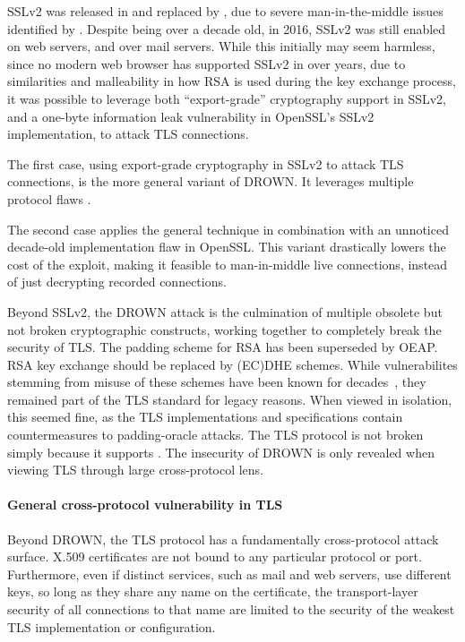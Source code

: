 SSLv2 was released in \TK and replaced by \TK, due to severe man-in-the-middle
issues identified by \TK. Despite being over a decade old, in 2016, SSLv2 was
still enabled on \TK web servers, and over \TK mail servers. While this 
initially may seem harmless, since no modern web browser has supported SSLv2
in over \TK years, due to similarities and malleability in how RSA is used
during the key exchange process, it was possible to leverage both
``export-grade'' cryptography support in SSLv2, and a one-byte information leak
vulnerability in OpenSSL's SSLv2 implementation, to attack TLS connections.

The first case, using export-grade cryptography in SSLv2 to attack TLS
connections, is the more general variant of DROWN. It leverages multiple
protocol flaws \TK.

The second case applies the general technique in combination
with an unnoticed decade-old implementation flaw in OpenSSL. This variant
drastically lowers the cost of the exploit, making it feasible to man-in-middle
live connections, instead of just decrypting recorded connections.

Beyond SSLv2, the DROWN attack is the culmination of multiple obsolete but not
broken cryptographic constructs, working together to completely break the
security of TLS\@. The \PKCS padding scheme for RSA has been superseded by
OEAP. RSA key exchange should be replaced by (EC)DHE schemes. While
vulnerabilites stemming from misuse of these schemes have been known for
decades~\cite{bleichenbacher-1998,bleichenbacher-three}, they remained part of
the TLS standard for legacy reasons. When viewed in isolation, this seemed
fine, as the TLS implementations and specifications contain countermeasures to
padding-oracle attacks. The TLS protocol is not broken simply because it
supports \PKCS. The insecurity of DROWN is only revealed when viewing TLS
through large cross-protocol lens.

\paragraph{General cross-protocol vulnerability in TLS}
Beyond DROWN, the TLS protocol has a fundamentally cross-protocol attack
surface. X.509 certificates are not bound to any particular protocol or port.
Furthermore, even if distinct services, such as mail and web servers, use
different keys, so long as they share any name on the certificate, the
transport-layer security of all connections to that name are limited to the
security of the weakest TLS implementation or configuration.

